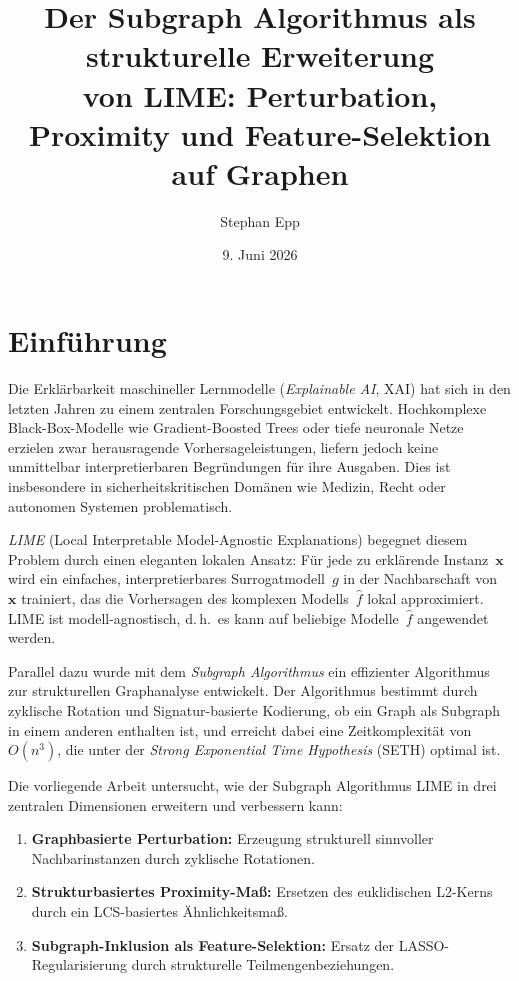 ﻿\documentclass[a4paper,12pt]{article}
\title{\textbf{Der Subgraph Algorithmus als strukturelle Erweiterung\\
von LIME: Perturbation, Proximity und Feature-Selektion\\
auf Graphen}}
\author{Stephan Epp}
\date{9. Juni 2026}
\theoremstyle{definition}
\begin{document}
\maketitle
\tableofcontents
\newpage

\section{Einführung}

Die Erklärbarkeit maschineller Lernmodelle (\emph{Explainable AI}, XAI) hat sich in den
letzten Jahren zu einem zentralen Forschungsgebiet entwickelt.
Hochkomplexe Black-Box-Modelle wie Gradient-Boosted Trees oder tiefe neuronale Netze
erzielen zwar herausragende Vorhersageleistungen, liefern jedoch keine unmittelbar
interpretierbaren Begründungen für ihre Ausgaben.
Dies ist insbesondere in sicherheitskritischen Domänen wie Medizin, Recht oder autonomen
Systemen problematisch.

\emph{LIME} (Local Interpretable Model-Agnostic Explanations) \citep{Ribeiro2016} begegnet
diesem Problem durch einen eleganten lokalen Ansatz: Für jede zu erklärende Instanz~$\mathbf{x}$
wird ein einfaches, interpretierbares Surrogatmodell~$g$ in der Nachbarschaft von~$\mathbf{x}$
trainiert, das die Vorhersagen des komplexen Modells~$\hat{f}$ lokal approximiert.
LIME ist modell-agnostisch, d.\,h.\ es kann auf beliebige Modelle~$\hat{f}$ angewendet werden.

Parallel dazu wurde mit dem \emph{Subgraph Algorithmus} \citep{Epp2026} ein effizienter
Algorithmus zur strukturellen Graphanalyse entwickelt.
Der Algorithmus bestimmt durch zyklische Rotation und Signatur-basierte Kodierung, ob ein
Graph als Subgraph in einem anderen enthalten ist, und erreicht dabei eine Zeitkomplexität
von $O(n^3)$, die unter der \emph{Strong Exponential Time Hypothesis} (SETH) optimal ist.

Die vorliegende Arbeit untersucht, wie der Subgraph Algorithmus LIME in drei zentralen
Dimensionen erweitern und verbessern kann:
\begin{enumerate}
  \item \textbf{Graphbasierte Perturbation:} Erzeugung strukturell sinnvoller
        Nachbarinstanzen durch zyklische Rotationen.
  \item \textbf{Strukturbasiertes Proximity-Maß:} Ersetzen des euklidischen
        L2-Kerns durch ein LCS-basiertes Ähnlichkeitsmaß.
  \item \textbf{Subgraph-Inklusion als Feature-Selektion:} Ersatz der
        LASSO-Regularisierung durch strukturelle Teilmengenbeziehungen.
\end{enumerate}
\end{document}
